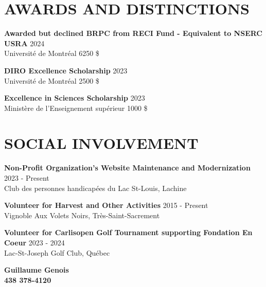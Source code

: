 \documentclass[11pt,a4paper]{article}
\newcommand{\awarditem}[4]{
\noindent
  \textbf{#1} \hfill #2 \\
  #3 \hfill #4 \\ \vspace{-10pt}
}
\newcommand{\volunteeritem}[3]{
\noindent
  \textbf{#1} \hfill #2 \\
  #3 \vspace{4pt}
}
\begin{document}
\section{AWARDS AND DISTINCTIONS}
\awarditem{Awarded but declined BRPC from RECI Fund - Equivalent to NSERC USRA}{2024}{Université de Montréal}{6250 \$}

\awarditem{DIRO Excellence Scholarship}{2023}{Université de Montréal}{2500 \$}

\awarditem{Excellence in Sciences Scholarship}{2023}{Ministère de l'Enseignement supérieur}{1000 \$}

\vspace{2pt}
\section{SOCIAL INVOLVEMENT}
\volunteeritem{Non-Profit Organization's Website Maintenance and Modernization}{2023 - Present}{Club des personnes handicapées du Lac St-Louis, Lachine}

\volunteeritem{Volunteer for Harvest and Other Activities}{2015 - Present}{Vignoble Aux Volets Noirs, Très-Saint-Sacrement}

\volunteeritem{Volunteer for Carlisopen Golf Tournament supporting Fondation En Coeur}{2023 - 2024}{Lac-St-Joseph Golf Club, Québec}

\vspace{10pt}
\begin{flushright}
  \textbf{Guillaume Genois} \\
  \textbf{438 378-4120}
\end{flushright}
\end{document}
